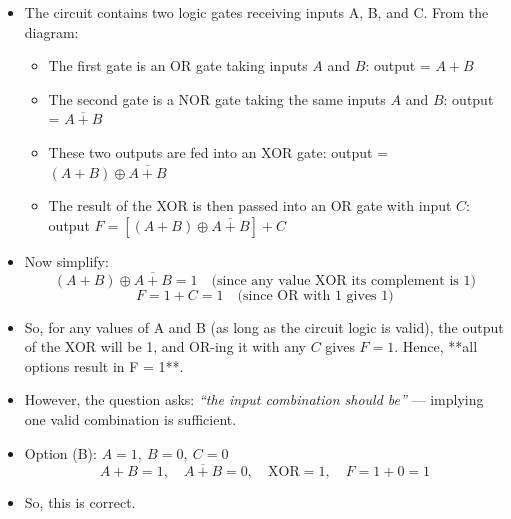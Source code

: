 \documentclass[12pt]{article}
\begin{document}
\begin{itemize}
    \item The circuit contains two logic gates receiving inputs A, B, and C. From the diagram:
    \begin{itemize}
        \item The first gate is an OR gate taking inputs \( A \) and \( B \): output = \( A + B \)
        \item The second gate is a NOR gate taking the same inputs \( A \) and \( B \): output = \( \overline{A + B} \)
        \item These two outputs are fed into an XOR gate: output = \( (A + B) \oplus \overline{A + B} \)
        \item The result of the XOR is then passed into an OR gate with input \( C \): output \( F = [(A + B) \oplus \overline{A + B}] + C \)
    \end{itemize}

    \item Now simplify:
    \[
    (A + B) \oplus \overline{A + B} = 1 \quad \text{(since any value XOR its complement is 1)}
    \]
    \[
    F = 1 + C = 1 \quad \text{(since OR with 1 gives 1)}
    \]

    \item So, for any values of A and B (as long as the circuit logic is valid), the output of the XOR will be 1, and OR-ing it with any \( C \) gives \( F = 1 \). Hence, **all options result in F = 1**.

    \item However, the question asks: \emph{“the input combination should be”} — implying one valid combination is sufficient.
    
    \item Option (B): \( A = 1,\ B = 0,\ C = 0 \)
    \[
    A + B = 1,\quad \overline{A + B} = 0,\quad \text{XOR} = 1,\quad F = 1 + 0 = 1
    \]
    \item So, this is correct.

\end{itemize}

\vspace{1em}
\noindent{}
\end{document}
